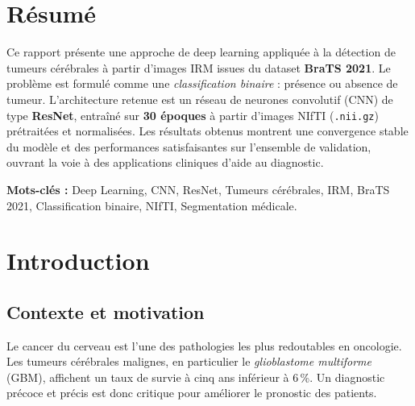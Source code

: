 \documentclass[12pt, a4paper]{report}
\begin{document}
\chapter*{Résumé}

Ce rapport présente une approche de deep learning appliquée à la détection de tumeurs cérébrales
à partir d'images IRM issues du dataset \textbf{BraTS 2021}.
Le problème est formulé comme une \textit{classification binaire} : présence ou absence de tumeur.
L'architecture retenue est un réseau de neurones convolutif (CNN) de type \textbf{ResNet},
entraîné sur \textbf{30 époques} à partir d'images NIfTI (\texttt{.nii.gz}) prétraitées et normalisées.
Les résultats obtenus montrent une convergence stable du modèle et des performances satisfaisantes
sur l'ensemble de validation, ouvrant la voie à des applications cliniques d'aide au diagnostic.

\bigskip
\noindent\textbf{Mots-clés :} Deep Learning, CNN, ResNet, Tumeurs cérébrales, IRM, BraTS 2021,
Classification binaire, NIfTI, Segmentation médicale.

\cleardoublepage

\tableofcontents
\cleardoublepage

\listoffigures
{}
\cleardoublepage

\chapter{Introduction}

\section{Contexte et motivation}

Le cancer du cerveau est l'une des pathologies les plus redoutables en oncologie.
Les tumeurs cérébrales malignes, en particulier le \textit{glioblastome multiforme} (GBM),
affichent un taux de survie à cinq ans inférieur à 6\,\%.
Un diagnostic précoce et précis est donc critique pour améliorer le pronostic des patients.
\end{document}
